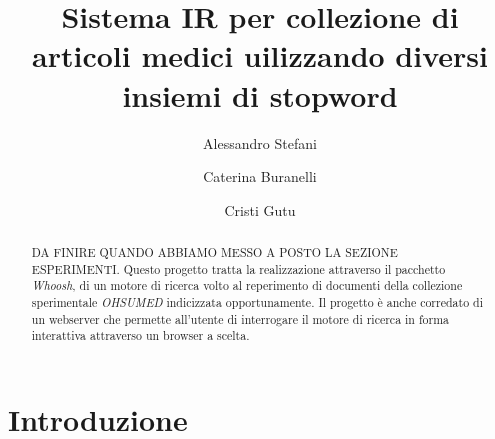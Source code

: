 \documentclass[runningheads]{llncs}
\begin{document}
%
\title{Sistema IR per collezione di articoli medici uilizzando diversi insiemi di stopword}
%
%
\author{%
  Alessandro Stefani \and
  Caterina Buranelli \and
  Cristi Gutu}
%
%
%
\maketitle
%
\begin{abstract}
DA FINIRE QUANDO ABBIAMO MESSO A POSTO LA SEZIONE ESPERIMENTI.
Questo progetto tratta la realizzazione attraverso il pacchetto \emph{Whoosh}, di un motore di ricerca
volto al reperimento di documenti della collezione sperimentale \emph{OHSUMED} indicizzata opportunamente.
Il progetto è anche corredato di un webserver che permette all'utente di interrogare il motore di ricerca
in forma interattiva attraverso un browser a scelta.
\end{abstract}

\section{Introduzione}
\label{sec:introduzione}
\end{document}
